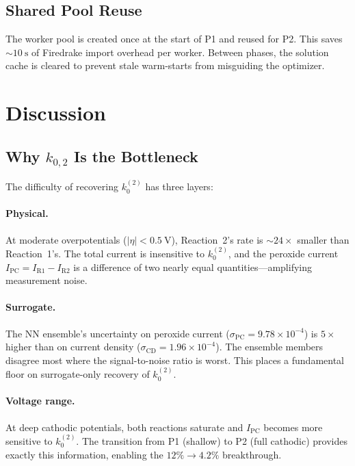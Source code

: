 \documentclass[11pt,a4paper]{article}
\newcommand{\kzero}{k_0}
\begin{document}
\subsection{Shared Pool Reuse}\label{sec:pool_reuse}

The worker pool is created once at the start of P1 and reused for P2.
This saves $\sim\!\SI{10}{\second}$ of Firedrake import overhead per
worker. Between phases, the solution cache is cleared to prevent stale
warm-starts from misguiding the optimizer.


\section{Discussion}\label{sec:discussion}

\subsection{Why \texorpdfstring{$k_{0,2}$}{k0,2} Is the Bottleneck}

The difficulty of recovering $\kzero^{(2)}$ has three layers:

\paragraph{Physical.} At moderate overpotentials ($|\eta| < \SI{0.5}{\volt}$),
Reaction~2's rate is $\sim\!24\times$ smaller than Reaction~1's. The
total current is insensitive to $\kzero^{(2)}$, and the peroxide current
$I_{\mathrm{PC}} = I_{\mathrm{R1}} - I_{\mathrm{R2}}$ is a difference
of two nearly equal quantities---amplifying measurement noise.

\paragraph{Surrogate.} The NN ensemble's uncertainty on peroxide current
($\sigma_{\mathrm{PC}} = 9.78 \times 10^{-4}$) is $5\times$ higher than
on current density ($\sigma_{\mathrm{CD}} = 1.96 \times 10^{-4}$). The
ensemble members disagree most where the signal-to-noise ratio is worst.
This places a fundamental floor on surrogate-only recovery of $\kzero^{(2)}$.

\paragraph{Voltage range.} At deep cathodic potentials, both reactions
saturate and $I_{\mathrm{PC}}$ becomes more sensitive to $\kzero^{(2)}$.
The transition from P1 (shallow) to P2 (full cathodic) provides exactly
this information, enabling the $12\% \to 4.2\%$ breakthrough.
\end{document}
